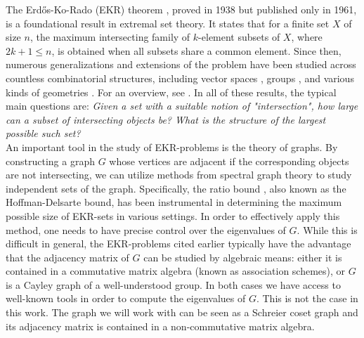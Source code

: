 \documentclass[11pt]{article}
\renewcommand{\leq}{\leqslant}
\begin{document}
The Erd\H{o}s-Ko-Rado (EKR) theorem \cite{OriginalEKR}, proved in 1938 but published only in 1961,  is a foundational result in extremal set theory. It states that for a finite set $X$ of size $n$, the maximum intersecting family of $k$-element subsets of $X$, where $2k+1 \leq n$, is obtained when all subsets share a common element. 
Since then, numerous generalizations and extensions of the problem have been studied across countless combinatorial structures, including vector spaces \cite{ekr_vectorspaces, hsieh}, groups \cite{EKR_permutations_fixed_cycles, stanton_ekr_chevalleygroups}, and various kinds of geometries \cite{adriansen_ekr_circlegeometries, Theorems_of_EKR_type_in_geometrical_settings, metsch_chromaticnumberoftwo}. For an overview, see \cite{EllisSurvey, GodsilMeagher}.
In all of these results, the typical main questions are: \emph{Given a set with a suitable notion of "intersection", how large can a subset of intersecting objects be? What is the structure of the largest possible such set?} \\


An important tool in the study of EKR-problems is the theory of graphs. By constructing a graph $G$ whose vertices are adjacent if the corresponding objects are not intersecting, we can utilize methods from spectral graph theory to study independent sets of the graph. Specifically, the ratio bound \cite{hoffman_bound_haemers}, also known as the Hoffman-Delsarte bound, has been instrumental in determining the maximum possible size of EKR-sets in various settings. In order to effectively apply this method, one needs to have precise control over the eigenvalues of $G$. While this is difficult in general, the EKR-problems cited earlier typically have the advantage that the adjacency matrix of $G$ can be studied by algebraic means: either it is contained in a commutative matrix algebra (known as association schemes), or $G$ is a Cayley graph of a well-understood group. In both cases we have access to well-known tools in order to compute the eigenvalues of $G$. This is not the case in this work. The graph we will work with can be seen as a Schreier coset graph and its adjacency matrix is contained in a non-commutative matrix algebra. 
\end{document}
